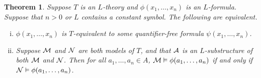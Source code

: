 \documentclass[10pt]{article}
\theoremstyle{newstyle}
\newtheorem{thm}{Theorem}[section]
\begin{document}
\begin{thm}
Suppose $T$ is an $L$-theory and $\phi(x_1, \dots, x_n)$ is an $L$-formula. 
Suppose that $n > 0$ or $L$ contains a constant symbol. The following are equivalent.
\begin{enumerate}[(i)]
    \item $\phi(x_1, \dots, x_n)$ is $T$-equivalent to some quantifier-free formula 
    $\psi(x_1, \dots, x_n)$. 
    \item Suppose ${\cal M}$ and ${\cal N}$ are both models of $T$, 
    and that ${\cal A}$ is an $L$-substructure of both ${\cal M}$ and ${\cal N}$. Then 
    for all $a_1, \dots, a_n \in A$, ${\cal M} \vDash \phi(a_1, \dots, a_n)$ if and only if 
    ${\cal N} \vDash \phi(a_1, \dots, a_n)$. 
\end{enumerate}
\end{thm}
\end{document}
